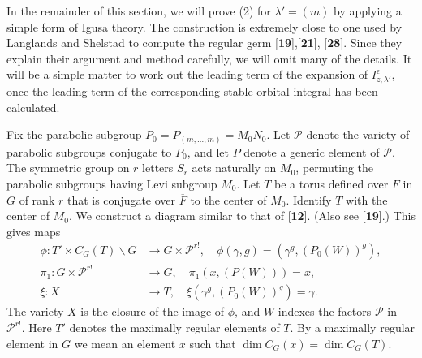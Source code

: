 \documentclass{amsart}
\begin{document}
\bigskip
In the remainder of this section, we will prove (2) for $\lambda'=(m)$ by applying a simple
form of Igusa theory.  The construction is extremely close to one used by
Langlands and Shelstad to compute the regular germ [{\bf 19}],[{\bf 21}],
[{\bf 28}].  Since they explain their
argument and method carefully, we will omit many of the details.  It will be a simple
matter to work out the leading term of the expansion of $I^\epsilon_{z,\lambda'}$,
once the leading term of the corresponding stable orbital integral has been
calculated.

Fix the parabolic subgroup $P_0 = P_{(m,\ldots,m)} = M_0N_0$.  Let ${\mathcal P}$
denote the variety of parabolic subgroups conjugate to $P_0$, and let
$P$ denote a generic element of $\mathcal P$.  The
symmetric group on $r$ letters $S_r$ acts naturally on $M_0$, permuting the
parabolic subgroups having Levi subgroup $M_0$.  Let $T$ be a torus defined over $F$
in $G$ of rank $r$ that is conjugate over $\overline F$ to the center of $M_0$.
Identify $T$ with the center of $M_0$.
We
construct a diagram similar to that of [{\bf 12}].  (Also see [{\bf 19}].)
This gives maps
\begin{align*} \phi:T'\times C_G(T)\backslash G &\to G\times {\mathcal P}^{r!},
     \quad \phi(\gamma,g) = (\gamma^g,(P_0(W))^g), \\
%
      \pi_1: G\times {\mathcal P}^{r!} &\to G,\quad
      \pi_1(x,(P(W))) = x,\\
%
      \xi: X &\to T,\quad
      \xi(\gamma^g,(P_0(W))^g) = \gamma.
\end{align*}
The variety $X$ is the
closure of the image of $\phi$, and $W$ indexes the factors $\mathcal P$
in ${\mathcal P}^{r!}$.  
Here $T'$ denotes the maximally regular elements of $T$.
By a maximally regular element
in $G$ we mean an element
$x$ such that $\dim C_G(x) =\dim C_G(T)$.
\end{document}

